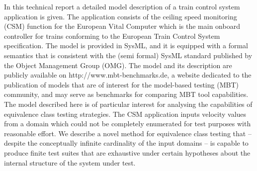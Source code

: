 In this technical report a detailed model description of a train control system application is given. The application consists of the ceiling speed monitoring (CSM) function for the European Vital Computer which is the main onboard controller for trains conforming to the European Train Control System specification. The model is provided in SysML, and it is equipped with a formal semantics that is consistent with the (semi formal) SysML standard published by the Object Management Group (OMG). The model and its description are publicly available on http://www.mbt-benchmarks.de, a website dedicated to the publication of models that are of interest for the model-based testing (MBT) community, and may serve as benchmarks for comparing MBT tool capabilities. The model described here is of particular interest for analysing the capabilities of equivalence class testing strategies. The CSM application inputs velocity values from a domain which could not be completely enumerated for test purposes with reasonable effort. 
We describe a novel method for equivalence class testing that -- despite the conceptually infinite cardinality of the input domains -- is capable to produce finite test suites that are exhaustive under certain hypotheses about the internal structure of the system under test.